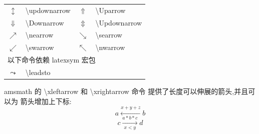 \documentclass[a4paper]{ctexart}
\begin{document}
\begin{table}[H]
\begin{tabular}{clcl}
            $\updownarrow$          & \textbackslash updownarrow                        & $\Uparrow$                  & \textbackslash Uparrow              \\
            $\Downarrow$            & \textbackslash Downarrow                          & $\Updownarrow$              & \textbackslash Updownarrow          \\
            $\nearrow$              & \textbackslash nearrow                            & $\searrow$                  & \textbackslash searrow              \\
            $\swarrow$              & \textbackslash swarrow                            & $\nwarrow$                  & \textbackslash nwarrow              \\
            \midrule
            \multicolumn{4}{l}{以下命令依赖 latexsym 宏包} \\
            $\leadsto$              & \textbackslash leadsto                                                                                                \\
            \bottomrule
        \end{tabular}
    \end{table}
    amsmath 的 \textbackslash xleftarrow 和 \textbackslash xrightarrow 命令%
    提供了长度可以伸展的箭头,并且可以为 箭头增加上下标:
    \[ a\xleftarrow{x + y + z} b \]
    \[ c\xrightarrow[x < y]{a*b*c} d \]
\end{document}

